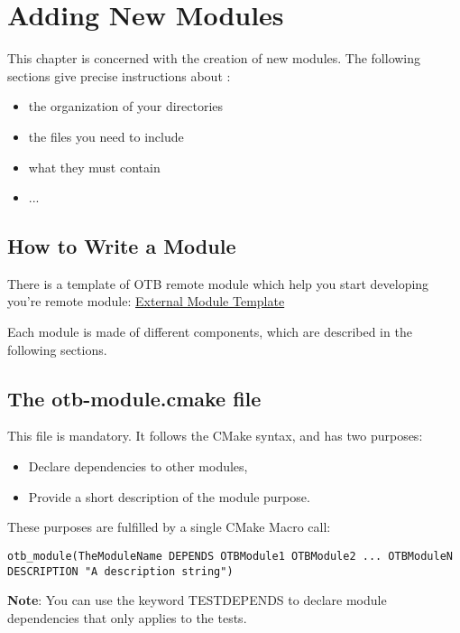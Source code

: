 \chapter{Adding New Modules}
\label{chapter:newModules}

This chapter is concerned with the creation of new modules. 
The following sections give precise instructions about :
\begin{itemize}
	\item the organization of your directories
	\item the files you need to include
	\item what they must contain
	\item ...
\end{itemize}

\section{How to Write a Module}
\label{sec:writemodule}

There is a template of OTB remote module which help you  start developing you're
remote module: \href{https://github.com/orfeotoolbox/otbExternalModuleTemplate}{External Module Template}

Each module is made of different components, which are described in the following sections.

\section{The otb-module.cmake file}

This file is mandatory. It follows the CMake syntax, and has two purposes: 

\begin{itemize}
       \item Declare dependencies to other modules, 
       \item Provide a short description of the module purpose. 
\end{itemize}

These purposes are fulfilled by a single CMake Macro call: 

\begin{verbatim}
otb_module(TheModuleName DEPENDS OTBModule1 OTBModule2 ... OTBModuleN DESCRIPTION "A description string")
\end{verbatim}

\textbf{Note}: You can use the keyword TEST\textunderscore DEPENDS to declare module dependencies that only applies to the tests.

